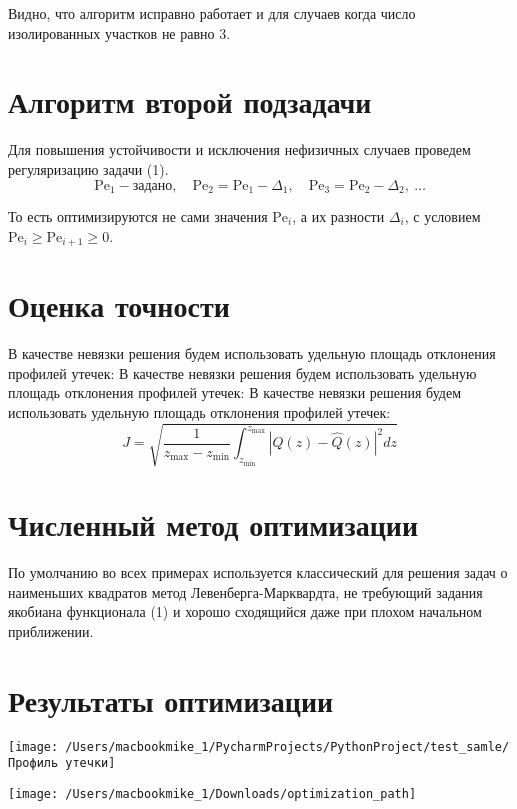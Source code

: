 \documentclass[12pt]{article}
\begin{document}
Видно, что алгоритм исправно работает и для случаев когда число изолированных участков не равно 3.

\section*{Алгоритм второй подзадачи}

Для повышения устойчивости и исключения нефизичных случаев проведем регуляризацию задачи (1).
\[
\text{Pe}_1 - \text{задано},\quad \text{Pe}_2 = \text{Pe}_1 - \Delta_1,\quad \text{Pe}_3 = \text{Pe}_2 - \Delta_2,\ \ldots
\]

То есть оптимизируются не сами значения $\text{Pe}_i$, а их разности $\Delta_i$, с условием $\text{Pe}_i \geq \text{Pe}_{i+1} \geq 0$.

\section*{Оценка точности}

В качестве невязки решения будем использовать удельную площадь отклонения профилей утечек:
В качестве невязки решения будем использовать удельную площадь отклонения профилей утечек:
В качестве невязки решения будем использовать удельную площадь отклонения профилей утечек:
\[
J = \sqrt{ \frac{1}{z_{\text{max}} - z_{\text{min}}} \int_{z_{\text{min}}}^{z_{\text{max}}} \left| Q(z) - \hat{Q}(z) \right|^2 dz } \tag{4}
\]

\section*{Численный метод оптимизации}
По умолчанию во всех примерах используется классический для решения задач о наименьших квадратов метод Левенберга-Марквардта, не требующий задания якобиана
функционала (1) и хорошо сходящийся даже при плохом начальном приближении.

\section*{Результаты оптимизации}

\begin{center}
    \begin{minipage}{0.48\textwidth}
        \texttt{[image: /Users/macbookmike\_1/PycharmProjects/PythonProject/test\_samle/Профиль утечки]}
    \end{minipage}
    \hfill
    \begin{minipage}{0.48\textwidth}
        \texttt{[image: /Users/macbookmike\_1/Downloads/optimization\_path]}
    \end{minipage}
\end{center}
\end{document}
